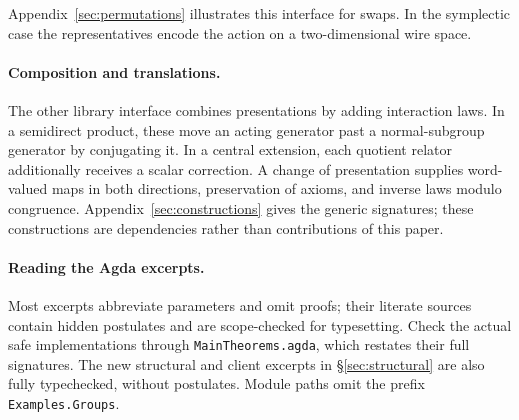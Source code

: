 Appendix~\ref{sec:permutations} illustrates this interface for swaps.
In the symplectic case the representatives encode the action on a
two-dimensional wire space.

\paragraph{Composition and translations.}
The other library interface combines presentations by adding interaction
laws. In a semidirect product, these move an acting generator past a
normal-subgroup generator by conjugating it. In a central extension,
each quotient relator additionally receives a scalar correction.
A change of presentation supplies word-valued maps in both directions,
preservation of axioms, and inverse laws modulo congruence.
Appendix~\ref{sec:constructions} gives the generic signatures; these
constructions are dependencies rather than contributions of this paper.

\paragraph{Reading the Agda excerpts.}
Most excerpts abbreviate parameters and omit proofs; their literate
sources contain hidden postulates and are scope-checked for typesetting.
Check the actual safe implementations through \texttt{MainTheorems.agda},
which restates their full signatures. The new structural and client
excerpts in \S\ref{sec:structural} are also fully typechecked, without
postulates. Module paths omit the prefix \texttt{Examples.Groups}.
